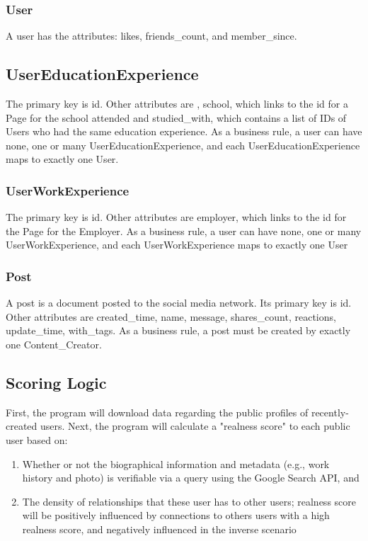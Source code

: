 \documentclass{article}
\begin{document}
\subsubsection{User}

A user has the attributes: likes, friends_count, and member_since.

\subsection{UserEducationExperience}

The primary key is id. Other attributes are , school, which links to the id for a Page for the school attended and studied_with, which contains a list of IDs of Users who had the same education experience. As a business rule, a user can have none, one or many UserEducationExperience, and each UserEducationExperience maps to exactly one User.

\subsubsection{UserWorkExperience}

The primary key is id. Other attributes are employer, which links to the id for the Page for the Employer. As a business rule, a user can have none, one or many UserWorkExperience, and each UserWorkExperience maps to exactly one User

\subsubsection{Post}

A post is a document posted to the social media network. Its primary key is id. Other attributes are created_time, name, message, shares_count, reactions, update_time, with_tags. As a business rule, a post must be created by exactly one Content_Creator.

\subsection*{Scoring Logic}

First, the program will download data regarding the public profiles of recently-created users.  Next, the program will calculate a "realness score" to each public user based on:

\begin{enumerate}
\item Whether or not the biographical information and metadata (e.g., work history and photo) is verifiable via a query using the Google Search API, and
\item The density of relationships that these user has to other users; realness score will be positively influenced by connections to others users with a high realness score, and negatively influenced in the inverse scenario
\end{enumerate}
\end{document}
